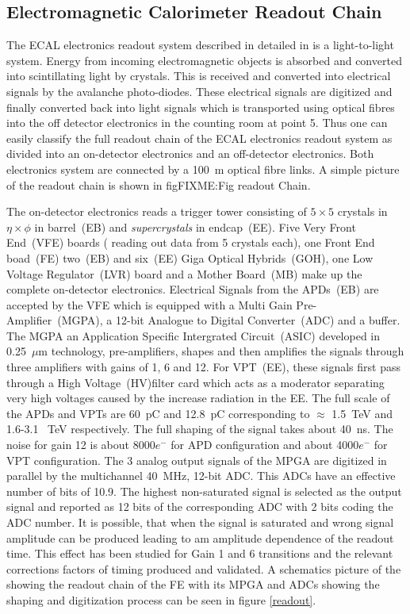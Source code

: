 \subsection{Electromagnetic Calorimeter Readout Chain}
The ECAL electronics readout system described in detailed in \cite{ECALREADOUT} is a light-to-light system. Energy from incoming electromagnetic objects is absorbed and converted into scintillating light by \pb crystals. This is received and converted into electrical signals by the avalanche photo-diodes. These electrical signals are digitized and finally converted back into light signals which is transported using optical fibres into the off detector electronics in the counting room at point 5. Thus one can easily classify the full readout chain of the ECAL electronics readout system as divided into an on-detector electronics and an off-detector electronics.
Both electronics system are connected by a 100~m optical fibre links. A simple picture of the readout chain is shown in fig{FIXME:Fig readout Chain}.

The on-detector electronics reads a trigger tower consisting of $5\times5$ crystals in $\eta \times \phi$ in barrel~(EB) and \textit{supercrystals} in endcap~(EE). Five Very Front End~(VFE) boards ( reading out  data from 5 crystals each), one Front End boad~(FE) two~(EB) and six~(EE) Giga Optical Hybrids~(GOH), one Low Voltage Regulator~(LVR) board and a Mother Board~(MB) make up the complete on-detector electronics. Electrical Signals from the APDs~(EB) are accepted by the VFE which is equipped with a Multi Gain Pre-Amplifier~(MGPA), a 12-bit Analogue to Digital Converter~(ADC) and a buffer. The MGPA an Application Specific Intergrated Circuit~(ASIC) developed in 0.25~$\mu$m technology, pre-amplifiers, shapes and then amplifies the signals through three amplifiers with gains of 1, 6 and 12. For VPT~(EE), these signals first pass through a High Voltage~(HV)filter card which acts as a moderator separating very high voltages caused by the increase radiation in the EE. The full scale of the APDs and VPTs are 60~pC and 12.8~pC corresponding to $\approx$ 1.5~TeV and 1.6-3.1~ TeV respectively. The full shaping of the signal takes about 40~ns. The noise for gain 12 is about 8000$e^{-}$ for APD configuration and about 4000$e^{-}$ for VPT configuration. 
The 3 analog output signals of the MPGA are digitized in parallel by the multichannel 40~MHz, 12-bit ADC. This ADCs have an effective number of bits of 10.9. The highest non-saturated signal is selected as the output signal and reported as 12 bits of the corresponding ADC with 2 bits coding the ADC number. It is possible, that when the signal is saturated and wrong signal amplitude can be produced leading to am amplitude dependence of the readout time. This effect has been studied for Gain 1 and 6 transitions and the relevant corrections factors of timing produced and validated.
A schematics picture of the showing the readout chain of the FE with its MPGA and ADCs showing the shaping and digitization process can be seen in figure \eqref{readout}.

